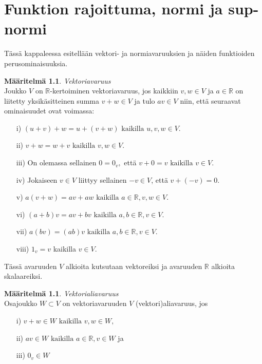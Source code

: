 \documentclass[12pt,a4paper,leqno]{report}
\newcommand{\R}{\mathbb{R}}
\newcommand{\N}{\mathbb{N}}
\theoremstyle{plain}
\theoremstyle{definition}
\newtheorem{maar}[equation]{Määritelmä}
\newtheorem{esim}[equation]{Esimerkki}
\theoremstyle{remark}
\begin{document}

\chapter{Funktion rajoittuma, normi ja sup-normi}\label{normi}

Tässä kappaleessa esitellään vektori- ja normiavaruuksien ja näiden funktioiden perusominaisuuksia. \cite{Topo1}
\begin{maar}
\emph{Vektoriavaruus}\\
Joukko $V$ on $\R$-kertoiminen vektoriavaruus, jos kaikkiin $v,w\in V$ ja $a\in \R$ on liitetty yksikäsitteinen summa $v+w\in V$ ja tulo $av\in V$ niin, että seuraavat ominaisuudet ovat voimassa:
\begin{itemize}
\item[i)\phantom{iiv}] $(u+v)+w=u+(v+w)\text{ kaikilla }u,v,w\in V.$
\item[ii)\phantom{iv}] $v+w=w+v\text{ kaikilla }v,w\in V.$
\item[iii)\phantom{v}] On olemassa sellainen $0=0_{v},$ että $v+0=v\text{ kaikilla }v\in V.$
\item[iv)\phantom{ii}] Jokaiseen $v\in V $ liittyy sellainen $-v\in V$, että $v+(-v)=0$.
\item[v)\phantom{iii}] $a(v+w)=av+aw\text{ kaikilla }a\in\R, v,w\in V.$
\item[vi)\phantom{ii}] $(a+b)v=av+bv\text{ kaikilla }a,b\in\R, v\in V.$
\item[vii)\phantom{i}] $a(bv)=(ab)v\text{ kaikilla }a,b\in\R, v\in V.$
\item[viii)] $1_{v}=v$ kaikilla $v\in V.$
\end{itemize}
Tässä avaruuden $V$ alkioita kutsutaan vektoreiksi ja avaruuden $\R$ alkioita skalaareiksi.

\end{maar}
\begin{maar}
\emph{Vektorialiavaruus}\\
Osajoukko $W\subset V$ on vektoriavaruuden $V$ (vektori)aliavaruus, jos
\begin{itemize}
\item[i)\phantom{iiv}] $v+w\in W\text{ kaikilla }v,w\in W,$
\item[ii)\phantom{iv}] $av\in W\text{ kaikilla }a\in\R, v\in W$ ja
\item[iii)\phantom{v}] $0_{v}\in W$
\end{itemize}

\end{maar}
\end{document}
